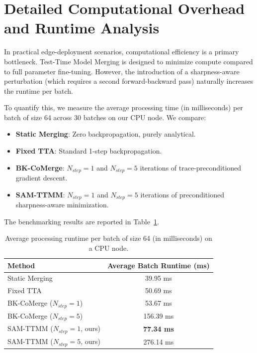 \documentclass{article}
\theoremstyle{plain}
\theoremstyle{definition}
\theoremstyle{remark}
\begin{document}
\section{Detailed Computational Overhead and Runtime Analysis}
\label{app:runtime}
In practical edge-deployment scenarios, computational efficiency is a primary bottleneck. Test-Time Model Merging is designed to minimize compute compared to full parameter fine-tuning. However, the introduction of a sharpness-aware perturbation (which requires a second forward-backward pass) naturally increases the runtime per batch.

To quantify this, we measure the average processing time (in milliseconds) per batch of size 64 across 30 batches on our CPU node. We compare:
\begin{itemize}
    \item \textbf{Static Merging}: Zero backpropagation, purely analytical.
    \item \textbf{Fixed TTA}: Standard 1-step backpropagation.
    \item \textbf{BK-CoMerge}: $N_{step}=1$ and $N_{step}=5$ iterations of trace-preconditioned gradient descent.
    \item \textbf{SAM-TTMM}: $N_{step}=1$ and $N_{step}=5$ iterations of preconditioned sharpness-aware minimization.
\end{itemize}

The benchmarking results are reported in Table~\ref{tab:runtime_bench}.

\begin{table}[H]
\caption{Average processing runtime per batch of size 64 (in milliseconds) on a CPU node.}
\label{tab:runtime_bench}
\vskip 0.15in
\begin{center}
\begin{small}
\begin{sc}
\begin{tabular}{lc}
\toprule
Method & Average Batch Runtime (ms) \\
\midrule
Static Merging & 39.95 ms \\
Fixed TTA & 50.69 ms \\
BK-CoMerge ($N_{step}=1$) & 53.67 ms \\
BK-CoMerge ($N_{step}=5$) & 156.39 ms \\
SAM-TTMM ($N_{step}=1$, ours) & \textbf{77.34 ms} \\
SAM-TTMM ($N_{step}=5$, ours) & 276.14 ms \\
\bottomrule
\end{tabular}
\end{sc}
\end{small}
\end{center}
\vskip -0.1in
\end{table}
\end{document}
